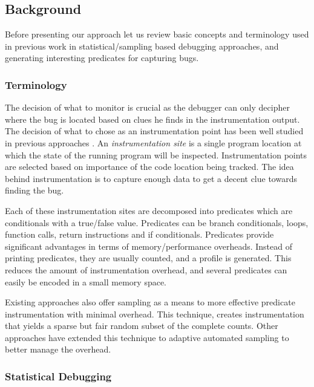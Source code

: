 \subsection{Background}
\label{sec:background-guided}

Before presenting our approach let us review basic concepts and terminology used in previous work in statistical/sampling based debugging approaches, and generating interesting predicates for capturing bugs.

\subsubsection{Terminology}
\label{sec: terminology-guided}



The decision of what to monitor is crucial as the debugger can only decipher where the bug is located based on clues he  finds in the instrumentation output.
The decision of what to chose as an instrumentation point has been well studied in previous approaches \cite{}.
An \emph{instrumentation site} is a single program location at which the state of the running program will be inspected.
Instrumentation points are selected based on importance of the code location being tracked.
The idea behind instrumentation is to capture enough data to get a decent clue towards finding the bug.

Each of these instrumentation sites are decomposed into predicates which are conditionals with a true/false value.
Predicates can be branch conditionals, loops, function calls, return instructions and if conditionals.
Predicates provide significant advantages in terms of memory/performance overheads.
Instead of printing predicates, they are usually counted, and a profile is generated.
This reduces the amount of instrumentation overhead, and several predicates can easily be encoded in a small memory space.

Existing approaches also offer sampling as a means to more effective predicate instrumentation with minimal overhead.
This technique, creates instrumentation that yields a sparse but fair random subset of the complete counts.
Other approaches have extended this technique to adaptive automated sampling to better manage the overhead.

\subsubsection{Statistical Debugging}
\label{sec:Statistical Debugging}

